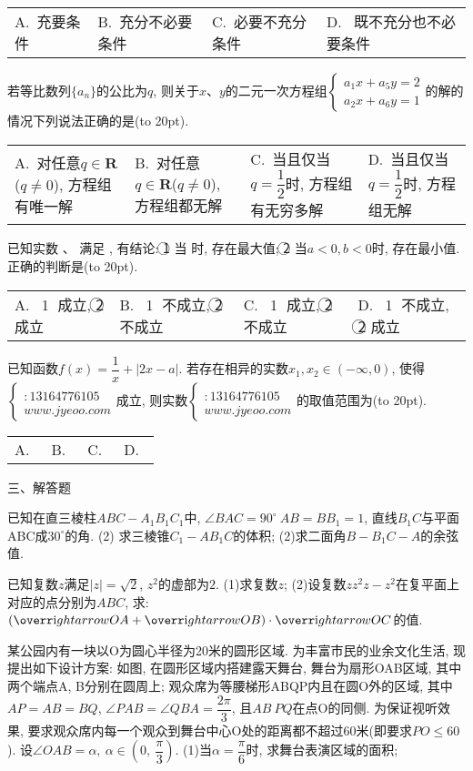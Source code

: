 \documentclass[10pt,a4paper]{article}
\newcommand{\bracket}[1]{(\hbox to #1pt{})}
\newcommand{\fourch}[4]{\par\begin{tabular}{p{.23\textwidth}p{.23\textwidth}p{.23\textwidth}p{.23\textwidth}}
A.~#1 &B.~#2& C.~#3& D.~#4
\end{tabular}}
\begin{document}
\fourch{充要条件}{充分不必要条件}{必要不充分条件}{ 既不充分也不必要条件}
\item 若等比数列$\{a_n\}$的公比为$q$, 则关于$x$、$y$的二元一次方程组$\begin{cases} a_1x+a_5y=2 \\ a_2x+a_6y=1 \end{cases}$的解的情况下列说法正确的是\bracket{20}.
\fourch{对任意$q\in \mathbf{R}$($q\ne 0$), 方程组有唯一解}{对任意$q\in \mathbf{R}$($q\ne 0$), 方程组都无解}{当且仅当$q=\dfrac 12$时, 方程组有无穷多解}{当且仅当$q=\dfrac 12$时, 方程组无解}
\item 已知实数 、 满足 , 有结论:
\textcircled{1}  当 时, 存在最大值;
\textcircled{2}  当$a<0,b<0$时, 存在最小值.  正确的判断是\bracket{20}.
\fourch{ \textcircled{1} 成立, \textcircled{2} 成立}{ \textcircled{1} 不成立, \textcircled{2} 不成立}{ \textcircled{1} 成立, \textcircled{2} 不成立}{ \textcircled{1} 不成立, \textcircled{2} 成立}
\item 已知函数$f(x)=\dfrac 1x+|2x-a|$. 若存在相异的实数$x_1,x_2\in (-\infty ,0)$, 使得$\begin{cases}  \\ : 13164776105~ \\ www.jyeoo.com \end{cases}$成立, 则实数$\begin{cases}  \\ : 13164776105~ \\ www.jyeoo.com \end{cases}$的取值范围为\bracket{20}.
\fourch{}{}{}{}
三、解答题
\item 已知在直三棱柱$ABC-A_1B_1C_1$中, $\angle BAC=90^\circ \ AB=BB_1=1$, 直线$B_1C$与平面ABC成$30^\circ$的角.
(2)	求三棱锥$C_1-AB_1C$的体积;
(2)求二面角$B-B_1C-A$的余弦值.
\item 已知复数$z$满足$|z|=\sqrt 2$, $z^2$的虚部为$2$.
(1)求复数$z$;
(2)设复数$zz^2z-z^2$在复平面上对应的点分别为$ABC$, 求: $(\overr\mathrm{i}ghtarrow{OA}+\overr\mathrm{i}ghtarrow{OB})\cdot \overr\mathrm{i}ghtarrow{OC}$的值.
\item 某公园内有一块以O为圆心半径为20米的圆形区域. 为丰富市民的业余文化生活, 现提出如下设计方案: 如图, 在圆形区域内搭建露天舞台, 舞台为扇形OAB区域, 其中两个端点A, B分别在圆周上; 观众席为等腰梯形ABQP内且在圆O外的区域, 其中$AP=AB=BQ$, $\angle PAB=\angle QBA=\dfrac{2\pi }3$, 且$AB\ PQ$在点O的同侧. 为保证视听效果, 要求观众席内每一个观众到舞台中心O处的距离都不超过60米(即要求$PO\le 60$). 设$\angle OAB=\alpha ,\ \alpha \in (0,\ \dfrac{\pi }3)$.
(1)当$\alpha =\dfrac{\pi }6$时, 求舞台表演区域的面积;
\end{document}
